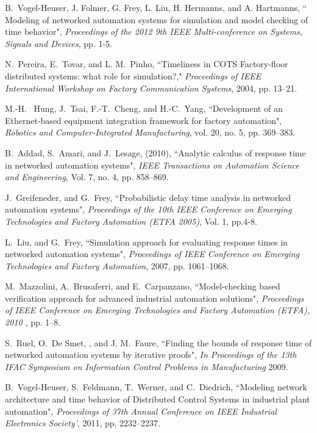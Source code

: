 \documentclass[letterpaper, 10 pt, conference]{ieeeconf}
\begin{document}
\begin{thebibliography}{1}

B.~Vogel-Heuser, J. Folmer, G. Frey, L. Liu, H. Hermanns, and A. Hartmanns, `` Modeling of networked automation systems for simulation and model checking of time behavior", {\emph{Proceedings of the 2012 9th IEEE Multi-conference on Systems, Signals and Devices}}, pp. 1-5.

N.~Pereira, E.~Tovar, and  L. M.~Pinho,  ``Timeliness in COTS Factory-floor distributed systems: what role for simulation?," {\em{ Proceedings of IEEE International Workshop on Factory Communication Systems}}, 2004, pp. 13--21.

M.-H.~ Hung, J.~Tsai, F.-T.~Cheng,  and  H.-C.~Yang, ``Development of an Ethernet-based equipment integration framework for factory automation",{\emph{ Robotics and Computer-Integrated Manufacturing}}, vol. 20, no. 5, pp. 369--383.

B.~Addad, S.~Amari, and J.~Lesage,  (2010), ``Analytic calculus of response time in networked automation systems", {\emph{IEEE Transactions on Automation Science and Engineering}}, Vol. 7, no. 4, pp. 858--869.


J.~Greifeneder, and G.~Frey, ``Probabilistic delay time analysis in networked automation systems", {\em{Proceedings of the 10th IEEE Conference on Emerging Technologies and Factory Automation (ETFA 2005)}}, Vol. 1, pp.4-8.

L.~Liu, and G.~Frey, ``Simulation approach for evaluating response times in networked automation systems", {\em{ Proceedings of IEEE Conference on Emerging Technologies and Factory Automation}}, 2007, pp. 1061--1068. 

M.~Mazzolini, A.~Brusaferri, and E.~Carpanzano, ``Model-checking based verification approach for advanced industrial automation solutions", {\em{ Proceedings of IEEE Conference on Emerging Technologies and Factory Automation (ETFA), 2010 }}, pp. 1--8. 

S.~Ruel,  O.~De Smet, , and J. M.~Faure,  ``Finding the bounds of response time of networked automation systems by iterative proofs", {\em{In Proceedings of the 13th IFAC Symposium on Information Control Problems in Manufacturing}} 2009.




B.~Vogel-Heuser, S.~Feldmann, T.~Werner, and C.~Diedrich,  ``Modeling network architecture and time behavior of Distributed Control Systems in industrial plant automation",{\em{ Proceedings of 37th Annual Conference on IEEE Industrial Electronics Society'}}, 2011, pp. 2232--2237.


\end{thebibliography}
\end{document}
